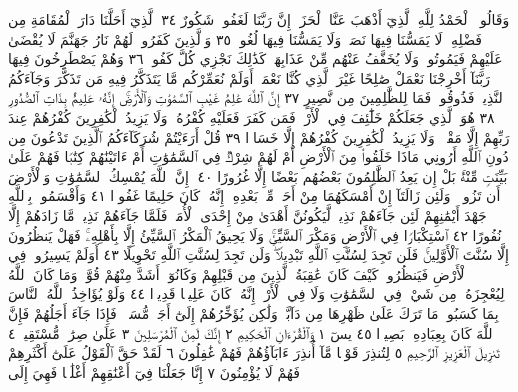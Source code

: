وَقَالُوا۟ ٱلْحَمْدُ لِلَّهِ ٱلَّذِيٓ أَذْهَبَ عَنَّا ٱلْحَزَنَۖ إِنَّ رَبَّنَا لَغَفُورࣱ
شَكُورٌ ٣٤ ٱلَّذِيٓ أَحَلَّنَا دَارَ ٱلْمُقَامَةِ مِن فَضْلِهِۦ لَا يَمَسُّنَا
فِيهَا نَصَبࣱ وَلَا يَمَسُّنَا فِيهَا لُغُوبࣱ ٣٥ وَٱلَّذِينَ كَفَرُوا۟ لَهُمْ
نَارُ جَهَنَّمَ لَا يُقْضَىٰ عَلَيْهِمْ فَيَمُوتُوا۟ وَلَا يُخَفَّفُ عَنْهُم مِّنْ
عَذَابِهَاۚ كَذَٰلِكَ نَجْزِي كُلَّ كَفُورࣲ ٣٦ وَهُمْ يَصْطَرِخُونَ
فِيهَا رَبَّنَآ أَخْرِجْنَا نَعْمَلْ صَٰلِحًا غَيْرَ ٱلَّذِي كُنَّا نَعْمَلُۚ
أَوَلَمْ نُعَمِّرْكُم مَّا يَتَذَكَّرُ فِيهِ مَن تَذَكَّرَ وَجَآءَكُمُ ٱلنَّذِيرُۖ
فَذُوقُوا۟ فَمَا لِلظَّٰلِمِينَ مِن نَّصِيرٍ ٣٧ إِنَّ ٱللَّهَ عَٰلِمُ
غَيْبِ ٱلسَّمَٰوَٰتِ وَٱلْأَرْضِۚ إِنَّهُۥ عَلِيمُۢ بِذَاتِ ٱلصُّدُورِ ٣٨
هُوَ ٱلَّذِي جَعَلَكُمْ خَلَٰٓئِفَ فِي ٱلْأَرْضِۚ فَمَن كَفَرَ فَعَلَيْهِ كُفْرُهُۥۖ وَلَا
يَزِيدُ ٱلْكَٰفِرِينَ كُفْرُهُمْ عِندَ رَبِّهِمْ إِلَّا مَقْتࣰاۖ وَلَا يَزِيدُ ٱلْكَٰفِرِينَ
كُفْرُهُمْ إِلَّا خَسَارࣰا ٣٩ قُلْ أَرَءَيْتُمْ شُرَكَآءَكُمُ ٱلَّذِينَ تَدْعُونَ مِن
دُونِ ٱللَّهِ أَرُونِي مَاذَا خَلَقُوا۟ مِنَ ٱلْأَرْضِ أَمْ لَهُمْ شِرْكࣱ فِي ٱلسَّمَٰوَٰتِ
أَمْ ءَاتَيْنَٰهُمْ كِتَٰبࣰا فَهُمْ عَلَىٰ بَيِّنَتࣲ مِّنْهُۚ بَلْ إِن يَعِدُ ٱلظَّٰلِمُونَ
بَعْضُهُم بَعْضًا إِلَّا غُرُورًا ٤٠۞ إِنَّ ٱللَّهَ يُمْسِكُ ٱلسَّمَٰوَٰتِ
وَٱلْأَرْضَ أَن تَزُولَاۚ وَلَئِن زَالَتَآ إِنْ أَمْسَكَهُمَا مِنْ أَحَدࣲ مِّنۢ بَعْدِهِۦٓۚ
إِنَّهُۥ كَانَ حَلِيمًا غَفُورࣰا ٤١ وَأَقْسَمُوا۟ بِٱللَّهِ جَهْدَ أَيْمَٰنِهِمْ لَئِن جَآءَهُمْ
نَذِيرࣱ لَّيَكُونُنَّ أَهْدَىٰ مِنْ إِحْدَى ٱلْأُمَمِۖ فَلَمَّا جَآءَهُمْ نَذِيرࣱ
مَّا زَادَهُمْ إِلَّا نُفُورًا ٤٢ ٱسْتِكْبَارࣰا فِي ٱلْأَرْضِ وَمَكْرَ ٱلسَّيِّئِۚ
وَلَا يَحِيقُ ٱلْمَكْرُ ٱلسَّيِّئُ إِلَّا بِأَهْلِهِۦۚ فَهَلْ يَنظُرُونَ إِلَّا سُنَّتَ
ٱلْأَوَّلِينَۚ فَلَن تَجِدَ لِسُنَّتِ ٱللَّهِ تَبْدِيلࣰاۖ وَلَن تَجِدَ لِسُنَّتِ ٱللَّهِ تَحْوِيلًا ٤٣
أَوَلَمْ يَسِيرُوا۟ فِي ٱلْأَرْضِ فَيَنظُرُوا۟ كَيْفَ كَانَ عَٰقِبَةُ ٱلَّذِينَ مِن
قَبْلِهِمْ وَكَانُوٓا۟ أَشَدَّ مِنْهُمْ قُوَّةࣰۚ وَمَا كَانَ ٱللَّهُ لِيُعْجِزَهُۥ مِن شَيْءࣲ
فِي ٱلسَّمَٰوَٰتِ وَلَا فِي ٱلْأَرْضِۚ إِنَّهُۥ كَانَ عَلِيمࣰا قَدِيرࣰا ٤٤
وَلَوْ يُؤَاخِذُ ٱللَّهُ ٱلنَّاسَ بِمَا كَسَبُوا۟ مَا تَرَكَ عَلَىٰ ظَهْرِهَا
مِن دَآبَّةࣲ وَلَٰكِن يُؤَخِّرُهُمْ إِلَىٰٓ أَجَلࣲ مُّسَمࣰّىۖ فَإِذَا
جَآءَ أَجَلُهُمْ فَإِنَّ ٱللَّهَ كَانَ بِعِبَادِهِۦ بَصِيرَۢا ٤٥
يسٓ ١ وَٱلْقُرْءَانِ ٱلْحَكِيمِ ٢ إِنَّكَ لَمِنَ ٱلْمُرْسَلِينَ ٣ عَلَىٰ
صِرَٰطࣲ مُّسْتَقِيمࣲ ٤ تَنزِيلَ ٱلْعَزِيزِ ٱلرَّحِيمِ ٥ لِتُنذِرَ قَوْمࣰا
مَّآ أُنذِرَ ءَابَآؤُهُمْ فَهُمْ غَٰفِلُونَ ٦ لَقَدْ حَقَّ ٱلْقَوْلُ عَلَىٰٓ أَكْثَرِهِمْ
فَهُمْ لَا يُؤْمِنُونَ ٧ إِنَّا جَعَلْنَا فِيٓ أَعْنَٰقِهِمْ أَغْلَٰلࣰا فَهِيَ إِلَى

